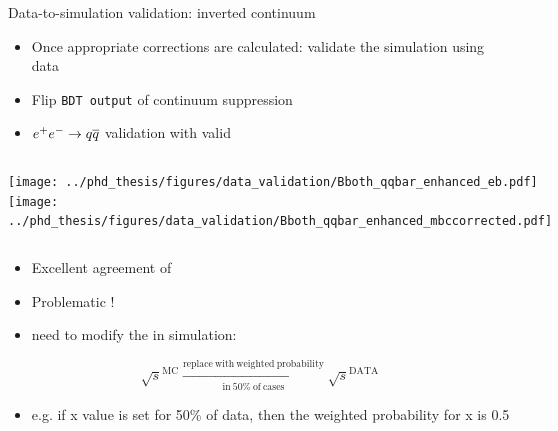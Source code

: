\documentclass[xcolor=dvipsnames]{beamer}
\begin{document}
\begin{frame}{Data-to-simulation validation: inverted continuum}
   \scriptsize\centering
   \begin{itemize}
      \item Once appropriate corrections are calculated: validate the simulation using data
      \item Flip \texttt{BDT output} of continuum suppression
      \item[\ra]  $e^+e^-\rightarrow q\overline q$ validation with valid \Mbc
   \end{itemize}

   \begin{columns}
      \centering
         \texttt{[image: ../phd\_thesis/figures/data\_validation/Bboth\_qqbar\_enhanced\_eb.pdf]}
      \centering
         \texttt{[image: ../phd\_thesis/figures/data\_validation/Bboth\_qqbar\_enhanced\_mbccorrected.pdf]}
   \end{columns}

   \begin{itemize}
      \item Excellent agreement of \EB
      \item Problematic \Mbc!
      \item[\ra] need to modify the \Mbc in simulation:  
   \end{itemize}
   \begin{equation*}
      \sqrt{s}^{\mathrm{MC}} \xrightarrow[\mathrm{in~50\%~of~cases}]{\mathrm{replace~with~weighted~probability}} \sqrt{s}^{\mathrm{DATA}}
   \end{equation*}

   \begin{itemize}
   \item[\ra] e.g. if x value is set for 50\% of data, then the weighted probability for x is 0.5
\end{itemize}
\end{frame}
\end{document}
